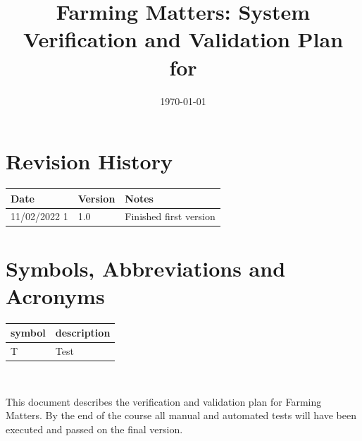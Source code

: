 \documentclass[12pt, titlepage]{article}
\begin{document}
\title{Farming Matters: System Verification and Validation Plan for \progname{}} 
\author{\authname}
\date{\today}
	
\maketitle


\section{Revision History}

\begin{tabularx}{\textwidth}{p{3cm}p{2cm}X}
\toprule {\bf Date} & {\bf Version} & {\bf Notes}\\
\midrule
11/02/2022 1 & 1.0 & Finished first version\\
\bottomrule
\end{tabularx}

\newpage

\tableofcontents

\listoftables
{}

\listoffigures
{}

\newpage

\section{Symbols, Abbreviations and Acronyms}

\renewcommand{\arraystretch}{1.2}
\begin{tabular}{l l} 
  \toprule		
  \textbf{symbol} & \textbf{description}\\
  \midrule 
  T & Test\\
  \bottomrule
\end{tabular}\\



\newpage


This document describes the verification and validation plan for Farming Matters. By the end of the course all manual and automated tests will have been executed and passed on the final version. 
\end{document}
